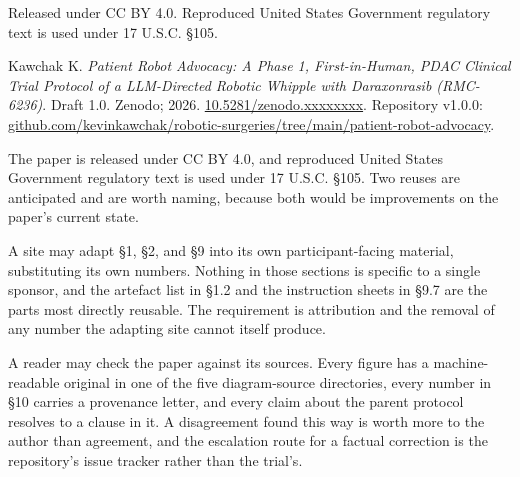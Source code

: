 
Released under CC BY 4.0. Reproduced United States Government regulatory text is
used under 17 U.S.C. \S 105.


\vspace{0.30em}

\noindent Kawchak K. \textit{Patient Robot Advocacy: A Phase 1, First-in-Human,
PDAC Clinical Trial Protocol of a LLM-Directed Robotic Whipple with Daraxonrasib
(RMC-6236)}. Draft 1.0. Zenodo; 2026.
\href{https://doi.org/10.5281/zenodo.xxxxxxxx}{10.5281/zenodo.xxxxxxxx}.
Repository v1.0.0:
\href{https://github.com/kevinkawchak/robotic-surgeries/tree/main/patient-robot-advocacy}{github.com/kevinkawchak/robotic-surgeries/tree/main/patient-robot-advocacy}.






The paper is released under CC BY 4.0, and reproduced United States Government
regulatory text is used under 17 U.S.C. \S 105. Two reuses are anticipated and
are worth naming, because both would be improvements on the paper's current
state.

A site may adapt \S 1, \S 2, and \S 9 into its own participant-facing material,
substituting its own numbers. Nothing in those sections is specific to a single
sponsor, and the artefact list in \S 1.2 and the instruction sheets in \S 9.7
are the parts most directly reusable. The requirement is attribution and the
removal of any number the adapting site cannot itself produce.

A reader may check the paper against its sources. Every figure has a
machine-readable original in one of the five diagram-source directories, every
number in \S 10 carries a provenance letter, and every claim about the parent
protocol resolves to a clause in it. A disagreement found this way is worth
more to the author than agreement, and the escalation route for a factual
correction is the repository's issue tracker rather than the trial's.
